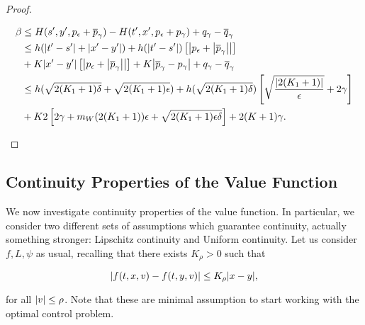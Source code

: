 \begin{proof}
\begin{enumerate}[label=\arabic*')]
       \begin{align*}
       \beta&\leq H(s',y',p_{\epsilon}+\overline{p}_{\gamma}) - H(t',x',p_{\epsilon}+p_{\gamma}) + q_{\gamma} - \overline{q}_{\gamma} \\
       & \leq h(\abs{t'-s'}+\abs{x'-y'})+h(\abs{t'-s'})\left[\abs{p_{\epsilon}+\abs{\overline{p}_{\gamma}}}\right] \\
       & + K\abs{x'-y'}\left[\abs{p_{\epsilon}+\abs{\overline{p}_{\gamma}}}\right]+K\abs{\overline{p}_{\gamma}-p_{\gamma}}+q_{\gamma}-\overline{q}_{\gamma} \\
       & \leq h(\sqrt{2(K_1+1)\delta}+\sqrt{2(K_1+1)\epsilon})+h(\sqrt{2(K_1+1)\delta})\left[\sqrt{\frac{\abs{2(K_1+1)}}{\epsilon}}+2\gamma\right] \\
       & + K2\left[2\gamma+m_W(2(K_1+1))\epsilon+\sqrt{2(K_1+1)\epsilon\delta}\right]+2(K+1)\gamma.
       \end{align*}
    \end{enumerate}
\end{proof}

\subsection{Continuity Properties of the Value Function}

We now investigate continuity properties of the value function. In particular, we consider two different sets of assumptions which guarantee continuity, actually 
something stronger: Lipschitz continuity and Uniform continuity. Let us consider $f,L,\psi$ as usual, recalling that there exists $K_{\rho}>0$ such that 

\begin{equation}\label{4-3-boundonf}
    \abs{f(t,x,v) - f(t,y,v)} \leq K_{\rho}\abs{x-y}, 
\end{equation}

for all $\abs{v}\leq\rho$. Note that these are minimal assumption to start working with the optimal control problem.

